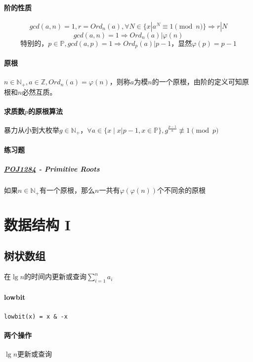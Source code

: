 \documentclass[]{cpp}
\begin{document}
\paragraph{阶的性质}
	$$gcd(a,n)=1,r=Ord_n(a),\forall N\in\{x|a^N\equiv1\pmod{n}\}\Rightarrow r|N$$
	$$gcd(a,n)=1\Rightarrow Ord_n(a)|\varphi(n)$$
	$$\mbox{特别的，}p\in\mathbb{P},gcd(a,p)=1\Rightarrow Ord_p(a)|p-1\mbox{，显然}\varphi(p)=p-1$$
\paragraph{原根} $n\in\mathbb{N_+},a\in\mathbb{Z},Ord_n(a)=\varphi(n)$，则称$a$为模$n$的一个原根，由阶的定义可知原根和$n$必然互质。
\paragraph{求质数$p$的原根算法} 暴力从小到大枚举$g\in\mathbb{N_+}$，$\forall a\in\{x\;|\;x|p-1,x\in\mathbb{P}\},g^{\frac{p-1}{a}}\not\equiv1\pmod{p}$
\paragraph{练习题}
\subparagraph{\href{http://poj.org/problem?id=1284}{POJ1284} - Primitive Roots} 如果$n\in\mathbb{N_+}$有一个原根，那么$n$一共有$\varphi(\varphi(n))$个不同余的原根
\section{数据结构 I}
\subsection{树状数组} 在$\lg{n}$的时间内更新或查询$\sum\limits_{i=1}^n a_i$
\paragraph{lowbit} \verb|lowbit(x) = x & -x|
\paragraph{两个操作} $\lg{n}$更新或查询
\end{document}

